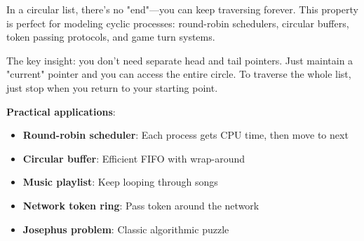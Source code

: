 In a circular list, there's no "end"---you can keep traversing forever. This property is perfect for modeling cyclic processes: round-robin schedulers, circular buffers, token passing protocols, and game turn systems.

The key insight: you don't need separate head and tail pointers. Just maintain a "current" pointer and you can access the entire circle. To traverse the whole list, just stop when you return to your starting point.

\textbf{Practical applications}:
\begin{itemize}
    \item \textbf{Round-robin scheduler}: Each process gets CPU time, then move to next
    \item \textbf{Circular buffer}: Efficient FIFO with wrap-around
    \item \textbf{Music playlist}: Keep looping through songs
    \item \textbf{Network token ring}: Pass token around the network
    \item \textbf{Josephus problem}: Classic algorithmic puzzle
\end{itemize}


